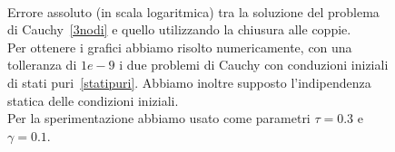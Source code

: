 \begin{figure}[!htb]
	\centering
	\subfloat[][Nodo 1.]
	{\resizebox{0.45\textwidth}{!}{}}
 \quad 
\subfloat[][Nodo 2.]
{\resizebox{0.45\textwidth}{!}{ }}
\\
\subfloat[][Nodo 3.]
{\resizebox{0.45\textwidth}{!}
{}}
\caption[Errori assoluti relativi al grafo~\ref{fig::3nodi} tra modello esatto e chiuso alle coppie] {Errore assoluto (in scala logaritmica) tra la soluzione del problema di Cauchy~\eqref{3nodi} e quello utilizzando la chiusura alle coppie.\\
Per ottenere i grafici abbiamo risolto numericamente, con una tolleranza di $1e-9$ i due problemi di Cauchy con conduzioni iniziali di stati puri~\eqref{statipuri}. Abbiamo inoltre supposto l'indipendenza statica delle condizioni iniziali.\\
Per la sperimentazione abbiamo usato come parametri $\tau = 0.3$ e $\gamma = 0.1$. }
\label{fig::errori3nodiPair}
\end{figure}

